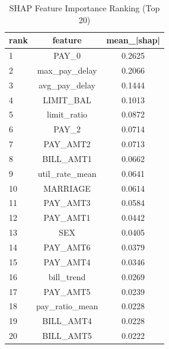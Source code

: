 \begin{table}
\centering
\caption{SHAP Feature Importance Ranking (Top 20)}
\label{tab:shap_ranking}
\begin{tabular}{lcc}
\toprule
rank & feature & mean_|shap| \\
\midrule
1 & PAY_0 & 0.2625 \\
2 & max_pay_delay & 0.2066 \\
3 & avg_pay_delay & 0.1444 \\
4 & LIMIT_BAL & 0.1013 \\
5 & limit_ratio & 0.0872 \\
6 & PAY_2 & 0.0714 \\
7 & PAY_AMT2 & 0.0713 \\
8 & BILL_AMT1 & 0.0662 \\
9 & util_rate_mean & 0.0641 \\
10 & MARRIAGE & 0.0614 \\
11 & PAY_AMT3 & 0.0584 \\
12 & PAY_AMT1 & 0.0442 \\
13 & SEX & 0.0405 \\
14 & PAY_AMT6 & 0.0379 \\
15 & PAY_AMT4 & 0.0346 \\
16 & bill_trend & 0.0269 \\
17 & PAY_AMT5 & 0.0239 \\
18 & pay_ratio_mean & 0.0228 \\
19 & BILL_AMT4 & 0.0228 \\
20 & BILL_AMT5 & 0.0222 \\
\bottomrule
\end{tabular}
\end{table}
